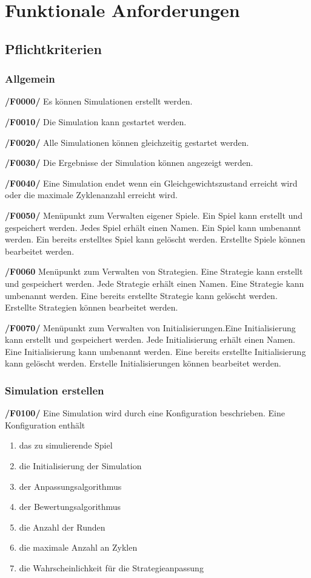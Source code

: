 \section{Funktionale Anforderungen}

\subsection{Pflichtkriterien}

\subsubsection{Allgemein}

\textbf{/F0000/}
Es können Simulationen erstellt werden.

\textbf{/F0010/} 
Die Simulation kann gestartet werden.

\textbf{/F0020/}
Alle Simulationen können gleichzeitig gestartet werden.

\textbf{/F0030/} 
Die Ergebnisse der Simulation können angezeigt werden.

\textbf{/F0040/}
Eine Simulation endet wenn ein Gleichgewichtszustand erreicht wird oder
die maximale Zyklenanzahl erreicht wird.

\textbf{/F0050/}
Menüpunkt zum Verwalten eigener Spiele. Ein Spiel kann erstellt und gespeichert werden. Jedes Spiel erhält einen Namen. Ein Spiel kann umbenannt werden. Ein bereits erstelltes Spiel kann gelöscht werden. Erstellte Spiele können bearbeitet werden.

\textbf{/F0060}
Menüpunkt zum Verwalten von Strategien. Eine Strategie kann erstellt und gespeichert werden. Jede Strategie erhält einen Namen. Eine Strategie kann umbenannt werden. Eine bereits erstellte Strategie kann gelöscht werden. Erstellte Strategien können bearbeitet werden.

\textbf{/F0070/}
Menüpunkt zum Verwalten von Initialisierungen.Eine Initialisierung kann erstellt und gespeichert werden. Jede Initialisierung  erhält einen Namen. Eine Initialisierung kann umbenannt werden. Eine bereits erstellte Initialisierung kann gelöscht werden. Erstelle Initialisierungen können bearbeitet werden.

\subsubsection{Simulation erstellen}

\textbf{/F0100/}
Eine Simulation wird durch eine Konfiguration beschrieben. Eine Konfiguration enthält
\begin{enumerate}
\item das zu simulierende Spiel
\item die Initialisierung der Simulation
\item der Anpassungsalgorithmus 
\item der Bewertungsalgorithmus
\item die Anzahl der Runden
\item die maximale Anzahl an Zyklen
\item die Wahrscheinlichkeit für die Strategieanpassung
\end{enumerate}

